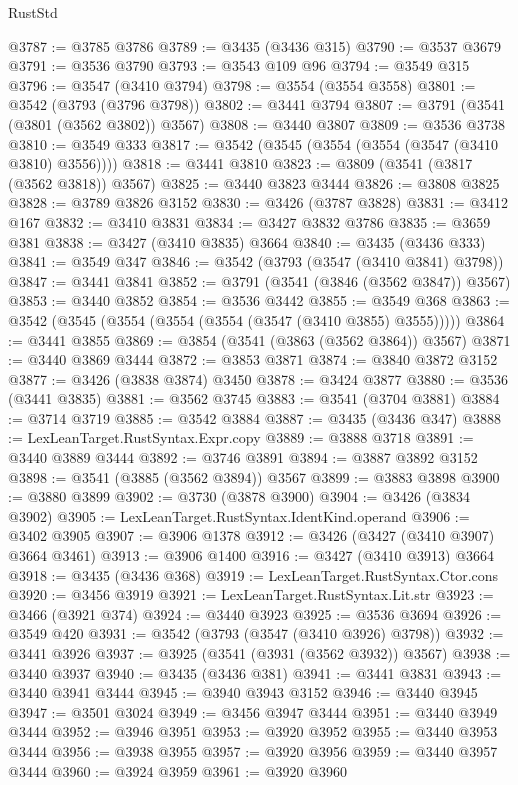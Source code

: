 \begin{lexlean}{RustStd}
\begin{coremodule}
@3787 := @3785 @3786
@3789 := @3435 (@3436 @315)
@3790 := @3537 @3679
@3791 := @3536 @3790
@3793 := @3543 @109 @96
@3794 := @3549 @315
@3796 := @3547 (@3410 @3794)
@3798 := @3554 (@3554 @3558)
@3801 := @3542 (@3793 (@3796 @3798))
@3802 := @3441 @3794
@3807 := @3791 (@3541 (@3801 (@3562 @3802)) @3567)
@3808 := @3440 @3807
@3809 := @3536 @3738
@3810 := @3549 @333
@3817 := @3542 (@3545 (@3554 (@3554 (@3547 (@3410 @3810) @3556))))
@3818 := @3441 @3810
@3823 := @3809 (@3541 (@3817 (@3562 @3818)) @3567)
@3825 := @3440 @3823 @3444
@3826 := @3808 @3825
@3828 := @3789 @3826 @3152
@3830 := @3426 (@3787 @3828)
@3831 := @3412 @167
@3832 := @3410 @3831
@3834 := @3427 @3832 @3786
@3835 := @3659 @381
@3838 := @3427 (@3410 @3835) @3664
@3840 := @3435 (@3436 @333)
@3841 := @3549 @347
@3846 := @3542 (@3793 (@3547 (@3410 @3841) @3798))
@3847 := @3441 @3841
@3852 := @3791 (@3541 (@3846 (@3562 @3847)) @3567)
@3853 := @3440 @3852
@3854 := @3536 @3442
@3855 := @3549 @368
@3863 := @3542 (@3545 (@3554 (@3554 (@3554 (@3547 (@3410 @3855) @3555)))))
@3864 := @3441 @3855
@3869 := @3854 (@3541 (@3863 (@3562 @3864)) @3567)
@3871 := @3440 @3869 @3444
@3872 := @3853 @3871
@3874 := @3840 @3872 @3152
@3877 := @3426 (@3838 @3874) @3450
@3878 := @3424 @3877
@3880 := @3536 (@3441 @3835)
@3881 := @3562 @3745
@3883 := @3541 (@3704 @3881)
@3884 := @3714 @3719
@3885 := @3542 @3884
@3887 := @3435 (@3436 @347)
@3888 := LexLeanTarget.RustSyntax.Expr.copy
@3889 := @3888 @3718
@3891 := @3440 @3889 @3444
@3892 := @3746 @3891
@3894 := @3887 @3892 @3152
@3898 := @3541 (@3885 (@3562 @3894)) @3567
@3899 := @3883 @3898
@3900 := @3880 @3899
@3902 := @3730 (@3878 @3900)
@3904 := @3426 (@3834 @3902)
@3905 := LexLeanTarget.RustSyntax.IdentKind.operand
@3906 := @3402 @3905
@3907 := @3906 @1378
@3912 := @3426 (@3427 (@3410 @3907) @3664 @3461)
@3913 := @3906 @1400
@3916 := @3427 (@3410 @3913) @3664
@3918 := @3435 (@3436 @368)
@3919 := LexLeanTarget.RustSyntax.Ctor.cons
@3920 := @3456 @3919
@3921 := LexLeanTarget.RustSyntax.Lit.str
@3923 := @3466 (@3921 @374)
@3924 := @3440 @3923
@3925 := @3536 @3694
@3926 := @3549 @420
@3931 := @3542 (@3793 (@3547 (@3410 @3926) @3798))
@3932 := @3441 @3926
@3937 := @3925 (@3541 (@3931 (@3562 @3932)) @3567)
@3938 := @3440 @3937
@3940 := @3435 (@3436 @381)
@3941 := @3441 @3831
@3943 := @3440 @3941 @3444
@3945 := @3940 @3943 @3152
@3946 := @3440 @3945
@3947 := @3501 @3024
@3949 := @3456 @3947 @3444
@3951 := @3440 @3949 @3444
@3952 := @3946 @3951
@3953 := @3920 @3952
@3955 := @3440 @3953 @3444
@3956 := @3938 @3955
@3957 := @3920 @3956
@3959 := @3440 @3957 @3444
@3960 := @3924 @3959
@3961 := @3920 @3960

\end{coremodule}
\end{lexlean}
